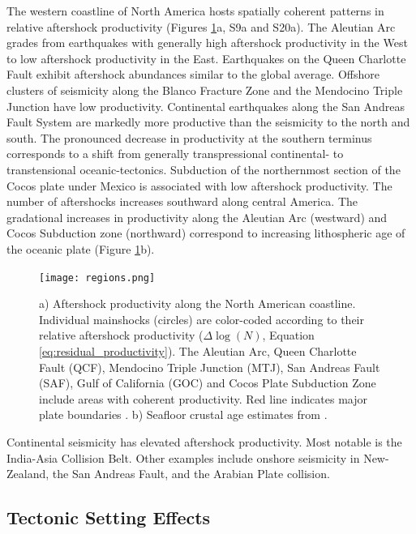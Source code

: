 \documentclass[draft, jgrga]{agujournal2018}
\begin{document}
    The western coastline of North America hosts spatially coherent patterns in relative aftershock productivity (Figures \ref{fig:region}a, S9a and S20a). The Aleutian Arc grades from earthquakes with generally high aftershock productivity in the West to low aftershock productivity in the East. Earthquakes on the Queen Charlotte Fault exhibit aftershock abundances similar to the global average. Offshore clusters of seismicity along the Blanco Fracture Zone and the Mendocino Triple Junction have low productivity. Continental earthquakes along the San Andreas Fault System are markedly more productive than the seismicity to the north and south. The pronounced decrease in productivity at the southern terminus corresponds to a shift from generally transpressional continental- to transtensional oceanic-tectonics. Subduction of the northernmost section of the Cocos plate under Mexico is associated with low aftershock productivity. The number of aftershocks increases southward along central America. The gradational increases in productivity along the Aleutian Arc (westward) and Cocos Subduction zone (northward) correspond to increasing lithospheric age of the oceanic plate (Figure \ref{fig:region}b).

    \begin{figure}
        \centering
        \texttt{[image: regions.png]}
        \caption{a) Aftershock productivity along the North American coastline.  Individual mainshocks (circles) are color-coded according to their relative aftershock productivity ($\Delta \log(N)$, Equation \ref{eq:residual_productivity}). The Aleutian Arc, Queen Charlotte Fault (QCF), Mendocino Triple Junction (MTJ), San Andreas Fault (SAF), Gulf of California (GOC) and Cocos Plate Subduction Zone include areas with coherent productivity. Red line indicates major plate boundaries \citep{Bird2003AnBoundaries}. b) Seafloor crustal age estimates from \citet{Muller2008}.}
        \label{fig:region}
    \end{figure}

    Continental seismicity has elevated aftershock productivity. Most notable is the India-Asia Collision Belt. Other examples include onshore seismicity in New-Zealand, the San Andreas Fault, and the Arabian Plate collision.

    \subsection{Tectonic Setting Effects}\label{sec:tectonic_setting}
\end{document}

